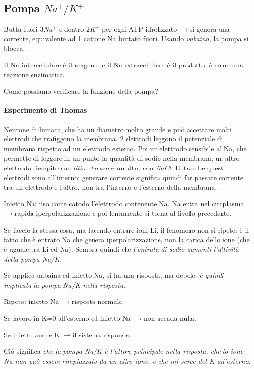\documentclass[a4paper,12pt]{article}
\newcommand{\lfreccia}{\ensuremath{\longrightarrow}}
\begin{document}
\subsection{Pompa $Na^{+}/K^{+}$}
Butta fuori $3 Na^{+}$ e dentro $2 K^{+}$ per ogni ATP idrolizzato \lfreccia si genera una corrente, equivalente ad 1 catione Na buttato fuori. Usando \emph{uabaina}, la pompa si blocca.

Il Na intracellulare è il reagente e il Na extracellulare è il prodotto. è come una reazione enzimatica.

Come possiamo verificare la funzione della pompa?

\paragraph{Esperimento di Thomas}
Neurone di lumaca, che ha un diametro molto grande e può accettare molti elettrodi che trafiggono la membrana. 2 elettrodi leggono il potenziale di membrana rispetto ad un elettrodo esterno. Poi un'elettrodo sensibile al Na, che permette di leggere in un punto la quantità di sodio nella membrana; un altro elettrodo riempito con \emph{litio cloruro} e un altro con \emph{NaCl}. Entrambe questi elettrodi sono all'interno: generare corrente significa quindi far passare corrente tra un elettrodo e l'altro, non tra l'interno e l'esterno della membrana.

Inietto Na: uso come catodo l'elettrodo contenente Na. Na entra nel citoplasma \lfreccia rapida iperpolarizzazione e poi lentamente si torna al livello precedente.

Se faccio la stessa cosa, ma facendo entrare ioni Li, il fenomeno non si ripete: è il fatto che è entrato Na che genera iperpolarizzazione, non la carica dello ione (che è uguale tra Li ed Na). Sembra quindi che \emph{l'entrata di sodio aumenti l'attività della pompa Na/K}.

Se applico uabaina ed inietto Na, si ha una risposta, ma debole: \emph{è quindi implicata la pompa Na/K nella risposta}.

Ripeto: inietto Na \lfreccia risposta normale. 

Se lavoro in K=0 all'esterno ed inietto Na \lfreccia non accada nulla.

Se inietto anche K \lfreccia il sistema risponde.

Ciò significa \emph{che la pompa Na/K è l'attore principale nella risposta, che lo ione Na non può essere rimpiazzato da un altro ione, e che mi serve del K all'esterno}. 
\end{document}
